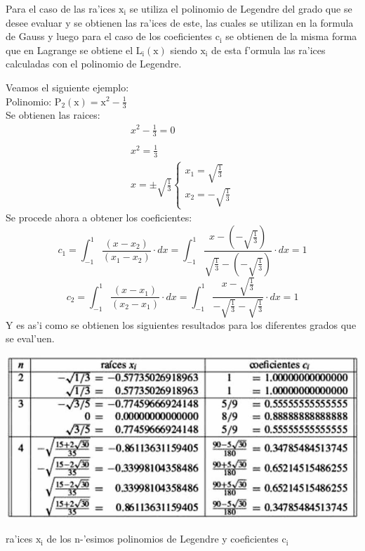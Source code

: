 \documentclass[12pt]{article}
\begin{document}
					Para el caso de las ra'ices $\mathrm{x_{i}}$ se utiliza el polinomio de Legendre del grado que se desee evaluar y se obtienen las ra'ices de este, las cuales se utilizan en la formula de Gauss y luego para el caso de los coeficientes $\mathrm{c_{i}}$ se obtienen de la misma forma que en Lagrange se obtiene el $\mathrm{L_{i}(x)}$ siendo $\mathrm{x_{i}}$ de esta f'ormula las ra'ices calculadas con el polinomio de Legendre.
					
					Veamos el siguiente ejemplo:\\
					Polinomio:  $\mathrm{P_{2}(x)=x^{2}-\frac{1}{3}}$\\
					Se obtienen las raices:
					\begin{equation}
						\begin{array}{lcc}
							x^{2}-\frac{1}{3}=0\\
							\\
							x^{2}=\frac{1}{3}\\
							x=\pm \sqrt{\frac{1}{3}}\left\{\begin{array}{lcc}
							x_{1}=\sqrt{\frac{1}{3}}\\
							x_{2}=-\sqrt{\frac{1}{3}}
							\end{array} 
							\right.
						\end{array}
					\end{equation}
					Se procede ahora a obtener los coeficientes:
					\begin{equation}
						c_{1}=\int_{-1}^{1}\frac{(x-x_{2})}{(x_{1}-x_{2})}\cdot dx=\int_{-1}^{1}\frac{x-(-\sqrt{\frac{1}{3}})}{\sqrt{\frac{1}{3}}-(-\sqrt{\frac{1}{3}})}\cdot dx=1
					\end{equation}
					\begin{equation}
					c_{2}=\int_{-1}^{1}\frac{(x-x_{1})}{(x_{2}-x_{1})}\cdot dx=\int_{-1}^{1}\frac{x-\sqrt{\frac{1}{3}}}{-\sqrt{\frac{1}{3}}-\sqrt{\frac{1}{3}}}\cdot dx=1
					\end{equation}
					Y es as'i como se obtienen los siguientes resultados para los diferentes grados que se eval'uen.
				\begin{center}
					\includegraphics[width=15cm]{roots}
					\par
					\vspace{0.2cm}
					ra'ices $\mathrm{x_{i}}$ de los n-'esimos polinomios de Legendre y coeficientes $\mathrm{c_{i}}$
				\end{center}
				
\end{document}
